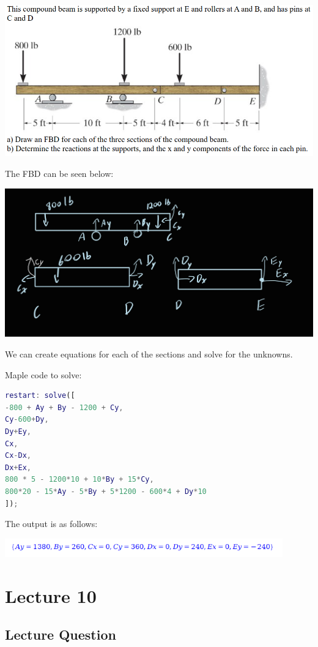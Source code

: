 \documentclass{article}[14pt, letterpaper, Times New Roman]
\begin{document}
\includegraphics[width=15cm]{l9-pbq.png}

The FBD can be seen below:

\includegraphics[width=15cm]{l9-pbq-fbd.png}

We can create equations for each of the sections and solve for the unknowns.

Maple code to solve:

\begin{lstlisting}[language=matlab]
restart: solve([
-800 + Ay + By - 1200 + Cy,
Cy-600+Dy,
Dy+Ey,
Cx,
Cx-Dx,
Dx+Ex,
800 * 5 - 1200*10 + 10*By + 15*Cy,
800*20 - 15*Ay - 5*By + 5*1200 - 600*4 + Dy*10
]);
\end{lstlisting}

The output is as follows:

\includegraphics[width=12cm]{l9-pbq-o.png}

\section{Lecture 10}

\subsection{Lecture Question}
\end{document}
